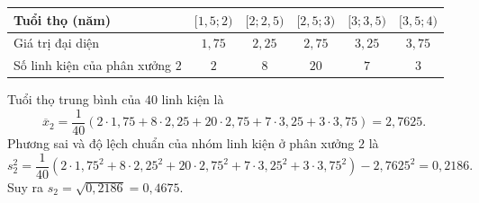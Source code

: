 \begin{bt}
{\begin{itemize}
\begin{center}
			\begin{tabular}{|l|c|c|c|c|c|}
				\hline Tuổi thọ (năm) & {$[1{,}5 ; 2)$} & {$[2 ; 2{,}5)$} & {$[2{,}5 ; 3)$} & {$[3 ; 3{,}5)$} & {$[3{,}5 ; 4)$} \\	
				\hline Giá trị đại diện &$1{,}75$ & $2{,}25$ & $2{,}75$ & $3{,}25$ & $3{,}75$\\		
				\hline Số linh kiện của phân xưởng $2$ & $2$ & $8$ & $20$ & $7$ & $3$ \\					
				\hline
			\end{tabular}
		\end{center}
			Tuổi thọ trung bình của $40$ linh kiện là
			$$\overline{x}_2=\dfrac{1}{40}(2\cdot 1{,}75+8\cdot 2{,}25+20\cdot 2{,}75+7\cdot 3{,}25+3\cdot 3{,}75)=2{,}7625.$$
			Phương sai và độ lệch chuẩn	của nhóm linh kiện ở phân xưởng $2$ là
			$$s_2^2=\dfrac{1}{40}\left(2\cdot 1{,}75^2+8\cdot 2{,}25^2+20\cdot 2{,}75^2+7\cdot 3,25^2+3\cdot 3{,}75^2\right)-2{,}7625^2=0{,}2186. $$
			Suy ra $s_2=\sqrt{0{,}2186}=0{,}4675.$	
		\end{itemize}
	}
\end{bt}

